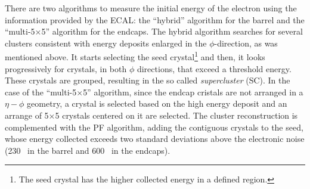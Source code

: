\noindent There are two algorithms to measure the initial energy of the 
electron using the information provided by the ECAL: the ``hybrid'' algorithm for 
the barrel and the ``multi-5$\times$5'' algorithm for the endcaps. The hybrid algorithm
searches for several clusters consistent with energy deposits enlarged in the $\phi$-direction, as 
was mentioned above. It starts selecting the seed crystal\footnote{The seed crystal has 
the higher collected energy in a defined region.} and then, it looks 
progressively for crystals, in both $\phi$ directions, that exceed a threshold 
energy. These crystals are grouped, resulting in the so called \textit{supercluster} (SC). In the 
case of the ``multi-5$\times$5'' algorithm, since the endcap cristals are not arranged in 
a $\eta-\phi$ geometry, a crystal is selected based on the high energy deposit and an 
arrange of 5$\times$5 crystals centered on it are selected. The cluster reconstruction is complemented 
with the PF algorithm, adding the contiguous crystals to the seed, whose 
energy collected exceeds two standard deviations above the electronic noise
(230 \MeV~in the barrel and 600 \MeV~in the endcaps). \\



